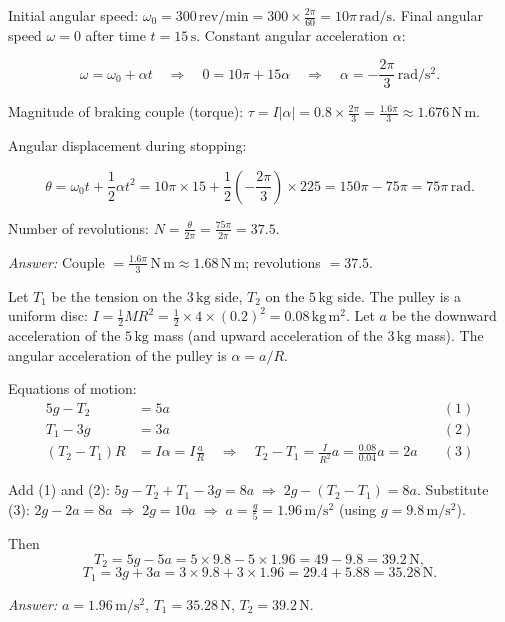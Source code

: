 \documentclass[11pt]{article}
\begin{document}
\begin{corrige}
Initial angular speed: \(\omega_0 = 300\,\mathrm{rev/min} = 300 \times \frac{2\pi}{60} = 10\pi\,\mathrm{rad/s}\).
Final angular speed \(\omega = 0\) after time \(t = 15\,\mathrm{s}\).
Constant angular acceleration \(\alpha\):

\[
\omega = \omega_0 + \alpha t \quad\Rightarrow\quad 0 = 10\pi + 15\alpha \quad\Rightarrow\quad \alpha = -\frac{2\pi}{3}\,\mathrm{rad/s^2}.
\]

Magnitude of braking couple (torque): \(\tau = I|\alpha| = 0.8 \times \frac{2\pi}{3} = \frac{1.6\pi}{3} \approx 1.676\,\mathrm{N\,m}\).

Angular displacement during stopping:

\[
\theta = \omega_0 t + \frac{1}{2}\alpha t^2 = 10\pi \times 15 + \frac{1}{2}\left(-\frac{2\pi}{3}\right) \times 225 = 150\pi - 75\pi = 75\pi\,\mathrm{rad}.
\]

Number of revolutions: \(N = \frac{\theta}{2\pi} = \frac{75\pi}{2\pi} = 37.5\).

\emph{Answer:} Couple \(= \frac{1.6\pi}{3}\,\mathrm{N\,m} \approx 1.68\,\mathrm{N\,m}\); revolutions \(= 37.5\).
\end{corrige}

\begin{corrige}
Let \(T_1\) be the tension on the \(3\,\mathrm{kg}\) side, \(T_2\) on the \(5\,\mathrm{kg}\) side. The pulley is a uniform disc: \(I = \frac{1}{2} M R^2 = \frac{1}{2} \times 4 \times (0.2)^2 = 0.08\,\mathrm{kg\,m^2}\). Let \(a\) be the downward acceleration of the \(5\,\mathrm{kg}\) mass (and upward acceleration of the \(3\,\mathrm{kg}\) mass). The angular acceleration of the pulley is \(\alpha = a/R\).

Equations of motion:
\begin{align*}
5g - T_2 &= 5a \quad &(1)\\
T_1 - 3g &= 3a \quad &(2)\\
(T_2 - T_1)R &= I\alpha = I\frac{a}{R} \quad\Rightarrow\quad T_2 - T_1 = \frac{I}{R^2}a = \frac{0.08}{0.04}a = 2a \quad &(3)
\end{align*}

Add (1) and (2): \(5g - T_2 + T_1 - 3g = 8a \;\Rightarrow\; 2g - (T_2 - T_1) = 8a\).
Substitute (3): \(2g - 2a = 8a \;\Rightarrow\; 2g = 10a \;\Rightarrow\; a = \frac{g}{5} = 1.96\,\mathrm{m/s^2}\) (using \(g=9.8\,\mathrm{m/s^2}\)).

Then
\[
T_2 = 5g - 5a = 5 \times 9.8 - 5 \times 1.96 = 49 - 9.8 = 39.2\,\mathrm{N},
\]
\[
T_1 = 3g + 3a = 3 \times 9.8 + 3 \times 1.96 = 29.4 + 5.88 = 35.28\,\mathrm{N}.
\]

\emph{Answer:} \(a = 1.96\,\mathrm{m/s^2}\), \(T_1 = 35.28\,\mathrm{N}\), \(T_2 = 39.2\,\mathrm{N}\).
\end{corrige}
\end{document}
